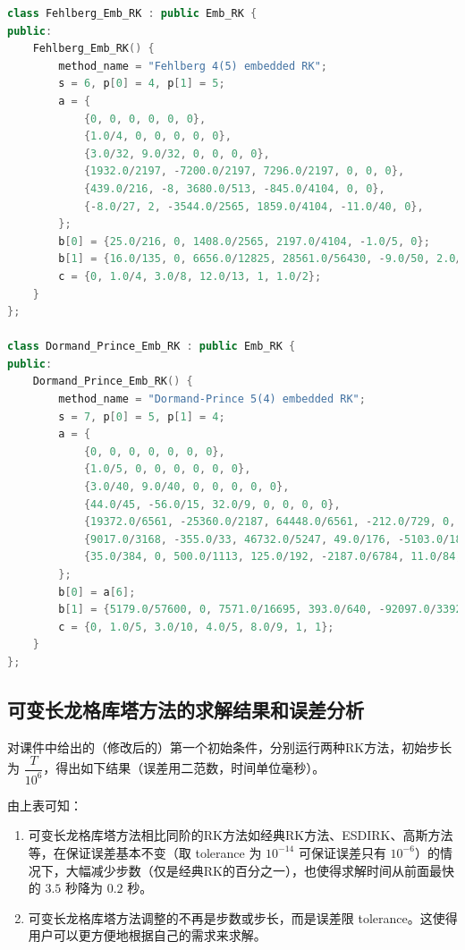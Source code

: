 \documentclass{ctexart}
\begin{document}
\begin{lstlisting}[language=c++]
class Fehlberg_Emb_RK : public Emb_RK {
public:
	Fehlberg_Emb_RK() {
		method_name = "Fehlberg 4(5) embedded RK";
		s = 6, p[0] = 4, p[1] = 5;
		a = {
			{0, 0, 0, 0, 0, 0},
			{1.0/4, 0, 0, 0, 0, 0},
			{3.0/32, 9.0/32, 0, 0, 0, 0},
			{1932.0/2197, -7200.0/2197, 7296.0/2197, 0, 0, 0},
			{439.0/216, -8, 3680.0/513, -845.0/4104, 0, 0},
			{-8.0/27, 2, -3544.0/2565, 1859.0/4104, -11.0/40, 0},
		};
		b[0] = {25.0/216, 0, 1408.0/2565, 2197.0/4104, -1.0/5, 0};
		b[1] = {16.0/135, 0, 6656.0/12825, 28561.0/56430, -9.0/50, 2.0/55};
		c = {0, 1.0/4, 3.0/8, 12.0/13, 1, 1.0/2};
	}
};

class Dormand_Prince_Emb_RK : public Emb_RK {
public:
	Dormand_Prince_Emb_RK() {
		method_name = "Dormand-Prince 5(4) embedded RK";
		s = 7, p[0] = 5, p[1] = 4;
		a = {
			{0, 0, 0, 0, 0, 0, 0},
			{1.0/5, 0, 0, 0, 0, 0, 0},
			{3.0/40, 9.0/40, 0, 0, 0, 0, 0},
			{44.0/45, -56.0/15, 32.0/9, 0, 0, 0, 0},
			{19372.0/6561, -25360.0/2187, 64448.0/6561, -212.0/729, 0, 0, 0},
			{9017.0/3168, -355.0/33, 46732.0/5247, 49.0/176, -5103.0/18656, 0, 0},
			{35.0/384, 0, 500.0/1113, 125.0/192, -2187.0/6784, 11.0/84, 0}
		};
		b[0] = a[6];
		b[1] = {5179.0/57600, 0, 7571.0/16695, 393.0/640, -92097.0/339200, 187.0/2100, 1.0/40};
		c = {0, 1.0/5, 3.0/10, 4.0/5, 8.0/9, 1, 1};
	}
};
\end{lstlisting}

\subsection{可变长龙格库塔方法的求解结果和误差分析}

对课件中给出的（修改后的）第一个初始条件，分别运行两种RK方法，初始步长为 $\dfrac T{10^6}$，得出如下结果（误差用二范数，时间单位毫秒）。

\begin{table}\centering
	\caption{可变长龙格库塔方法的误差、步数和效率}
\end{table}

由上表可知：
\begin{enumerate}
	\item 可变长龙格库塔方法相比同阶的RK方法如经典RK方法、ESDIRK、高斯方法等，在保证误差基本不变（取 tolerance 为 $10^{-14}$ 可保证误差只有 $10^{-6}$）的情况下，大幅减少步数（仅是经典RK的百分之一），也使得求解时间从前面最快的 $3.5$ 秒降为 $0.2$ 秒。
	\item 可变长龙格库塔方法调整的不再是步数或步长，而是误差限 tolerance。这使得用户可以更方便地根据自己的需求来求解。
\end{enumerate}
\end{document}
